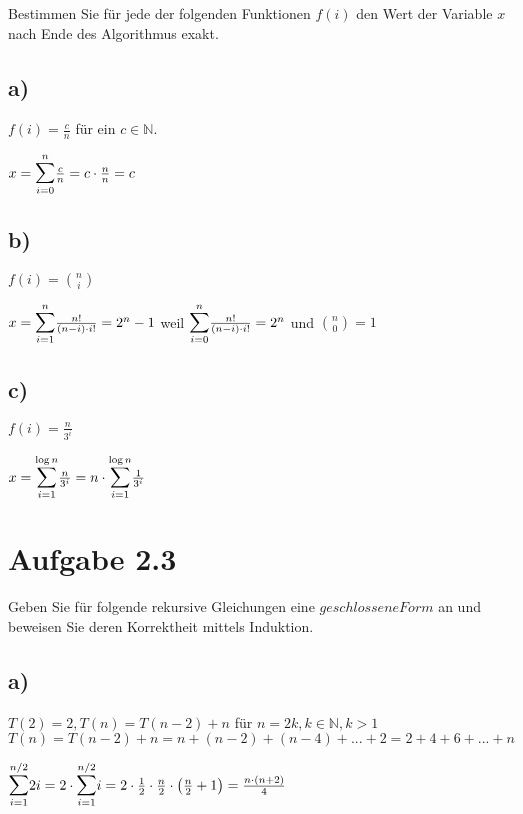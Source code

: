 \documentclass[a4paper]{article}
\begin{document}
Bestimmen Sie für jede der folgenden Funktionen $f(i)$ den Wert der Variable $x$ nach Ende des
Algorithmus exakt.

\subsection*{a)}
$f(i) = \frac{c}{n}$ für ein $c \in  \mathbb{N}$.

$x = \mathlarger{\mathlarger{\sum}}_{i=0}^{n}\frac{c}{n} = c \cdot \frac{n}{n} = c$

\subsection*{b)}
$f(i) = \binom{n}{i}$

$x = \mathlarger{\mathlarger{\sum}}_{i = 1}^{n} \frac{n!}{(n - i) \cdot i!} = 2^n - 1$ weil $\mathlarger{\mathlarger{\sum}}_{i = 0}^{n} \frac{n!}{(n - i) \cdot i!} = 2^n$ und $\binom{n}{0} = 1$

\subsection*{c)}
$f(i) = \frac{n}{3^i}$

$x = \mathlarger{\mathlarger{\sum}}_{i = 1}^{\log{n}}\frac{n}{3^i} = n \cdot \mathlarger{\mathlarger{\sum}}_{i = 1}^{\log{n}}\frac{1}{3^i}$


\break
\section*{Aufgabe 2.3}
Geben Sie für folgende rekursive Gleichungen eine $geschlossene Form$ an und beweisen Sie deren
Korrektheit mittels Induktion.\\

\subsection*{a)}
$T(2) = 2, T(n) = T(n - 2) + n$ für $n = 2k, k \in \mathbb{N}, k > 1$\\

$T(n) = T(n - 2) + n = n + (n - 2) + (n - 4) + ... + 2 = 2 + 4 + 6 + ... + n$

$\mathlarger{\mathlarger{\sum}}_{i = 1}^{n/2}2i = 2 \cdot \mathlarger{\mathlarger{\sum}}_{i = 1}^{n/2}i = 2 \cdot \frac{1}{2} \cdot \frac{n}{2} \cdot \left(\frac{n}{2} + 1\right) = \frac{n \cdot \left(n + 2\right)}{4}$\\
\end{document}
